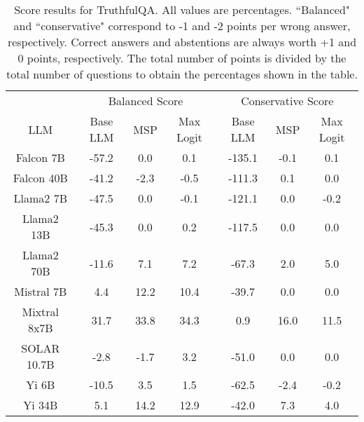 \begin{table*}
\centering
\begin{tabular}{c|c|c|c|c|c|c}
& \multicolumn{3}{c|}{Balanced Score} & \multicolumn{3}{c}{Conservative Score} \\ 
LLM & Base LLM & MSP & Max Logit & Base LLM & MSP & Max Logit\\ \hline
Falcon 7B & -57.2 & 0.0 & 0.1 & -135.1 & -0.1 & 0.1\\
Falcon 40B & -41.2 & -2.3 & -0.5 & -111.3 & 0.1 & 0.0\\
Llama2 7B & -47.5 & 0.0 & -0.1 & -121.1 & 0.0 & -0.2\\
Llama2 13B & -45.3 & 0.0 & 0.2 & -117.5 & 0.0 & 0.0\\
Llama2 70B & -11.6 & 7.1 & 7.2 & -67.3 & 2.0 & 5.0\\
Mistral 7B & 4.4 & 12.2 & 10.4 & -39.7 & 0.0 & 0.0\\
Mixtral 8x7B & 31.7 & 33.8 & 34.3 & 0.9 & 16.0 & 11.5\\
SOLAR 10.7B & -2.8 & -1.7 & 3.2 & -51.0 & 0.0 & 0.0\\
Yi 6B & -10.5 & 3.5 & 1.5 & -62.5 & -2.4 & -0.2\\
Yi 34B & 5.1 & 14.2 & 12.9 & -42.0 & 7.3 & 4.0\\
\hline
\end{tabular}
\caption{Score results for TruthfulQA. All values are percentages. ``Balanced" and ``conservative" correspond to -1 and -2 points per wrong answer, respectively. Correct answers and abstentions are always worth +1 and 0 points, respectively. The total number of points is divided by the total number of questions to obtain the percentages shown in the table.}
\label{tab:truthfulqa_score}
\end{table*}
